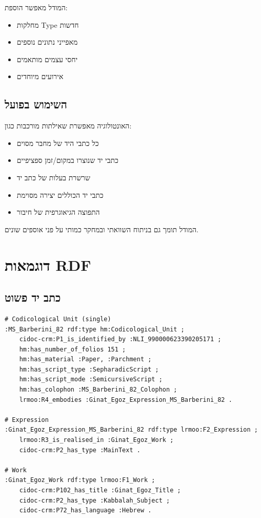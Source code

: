 \documentclass[12pt,a4paper]{article}
\begin{document}
המודל מאפשר הוספת:
\begin{itemize}
\item מחלקות Type חדשות
\item מאפייני נתונים נוספים
\item יחסי עצמים מותאמים
\item אירועים מיוחדים
\end{itemize}

\subsection{השימוש בפועל}

האונטולוגיה מאפשרת שאילתות מורכבות כגון:
\begin{itemize}
\item כל כתבי היד של מחבר מסוים
\item כתבי יד שנוצרו במקום/זמן ספציפיים
\item שרשרת בעלות של כתב יד
\item כתבי יד הכוללים יצירה מסוימת
\item התפוצה הגיאוגרפית של חיבור
\end{itemize}

המודל תומך גם בניתוח השוואתי ובמחקר כמותי על פני אוספים שונים.

\newpage

\section{דוגמאות RDF}

\subsection{כתב יד פשוט}

\begin{LTR}
\begin{verbatim}
# Codicological Unit (single)
:MS_Barberini_82 rdf:type hm:Codicological_Unit ;
    cidoc-crm:P1_is_identified_by :NLI_990000623390205171 ;
    hm:has_number_of_folios 151 ;
    hm:has_material :Paper, :Parchment ;
    hm:has_script_type :SepharadicScript ;
    hm:has_script_mode :SemicursiveScript ;
    hm:has_colophon :MS_Barberini_82_Colophon ;
    lrmoo:R4_embodies :Ginat_Egoz_Expression_MS_Barberini_82 .

# Expression
:Ginat_Egoz_Expression_MS_Barberini_82 rdf:type lrmoo:F2_Expression ;
    lrmoo:R3_is_realised_in :Ginat_Egoz_Work ;
    cidoc-crm:P2_has_type :MainText .

# Work
:Ginat_Egoz_Work rdf:type lrmoo:F1_Work ;
    cidoc-crm:P102_has_title :Ginat_Egoz_Title ;
    cidoc-crm:P2_has_type :Kabbalah_Subject ;
    cidoc-crm:P72_has_language :Hebrew .
\end{verbatim}
\end{LTR}
\end{document}
